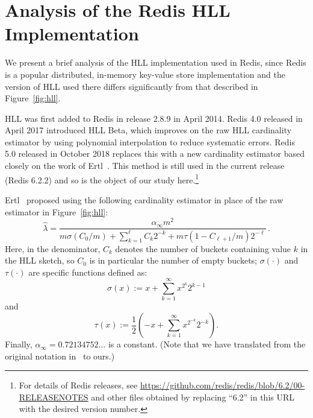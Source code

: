 \documentclass[sigconf, anonymous, dvipsnames]{acmart} %
\begin{document}


\section{Analysis of the Redis HLL Implementation}\label{sec:redis}

We present a brief analysis of the HLL implementation used in Redis, since Redis is a popular distributed, in-memory key-value store implementation and the version of HLL used there differs significantly from that described in Figure~\ref{fig:hll}.

HLL was first added to Redis in release 2.8.9 in April 2014. Redis 4.0 released in April 2017 introduced HLL Beta, which improves on the raw HLL cardinality estimator by using polynomial interpolation to reduce systematic errors. Redis 5.0 released in October 2018 replaces this with a new cardinality estimator based closely on the work of Ertl~\cite{hllnew}. This method is still used in the current release (Redis 6.2.2) and so is the object of our study here.\footnote{For details of Redis releases, see \url{https://github.com/redis/redis/blob/6.2/00-RELEASENOTES} and other files obtained by replacing ``6.2'' in this URL with the desired version number.}

Ertl~\cite{hllnew} proposed using the following cardinality estimator in place of the raw estimator in Figure~\ref{fig:hll}:
\begin{equation}\label{eqn:ertl}
\hat{\lambda}  = \frac{\alpha_\infty m^2}{m\sigma(C_0/m) + \sum_{k=1}^{\ell}C_k 2^{-k} + m \tau(1-C_{\ell+1}/m)2^{-\ell}} \, .
\end{equation}
Here, in the denominator, $C_k$ denotes the number of buckets containing value $k$ in the HLL sketch, so $C_0$ is in particular the number of empty buckets; $\sigma(\cdot)$ and $\tau(\cdot)$ are specific functions defined as:
\[
\sigma(x) :=  x + \sum_{k=1}^{\infty} x^{2^k} 2^{k-1}
\]
and
\[
\tau(x) :=  \frac{1}{2} \left( -x + \sum_{k=1}^{\infty} x^{2^{-k}} 2^{-k} \right).
\]
Finally,  $\alpha_\infty  = 0.72134752\ldots$ is a constant. (Note that we have translated from the original notation in~\cite{hllnew} to ours.)
\end{document}
